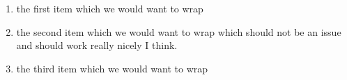 
\begin{enumerate}
  
  \item the first item which we would want to wrap
  
  \item the second item which we would want to wrap which should not be an issue and should work really nicely I think.
  
  \item the third item which we would want to wrap
  
\end{enumerate}

